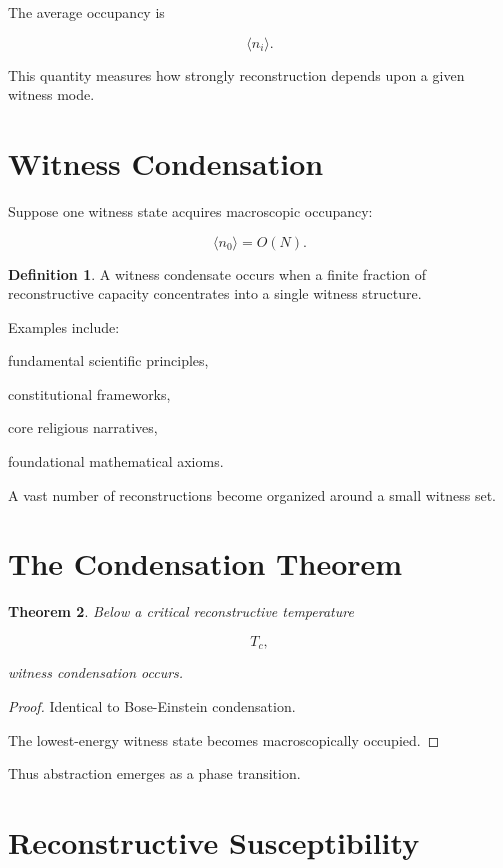 \documentclass[12pt,oneside]{book}
\theoremstyle{plain} \newtheorem{theorem}{Theorem}[chapter] \newtheorem{lemma}[theorem]{Lemma} \newtheorem{proposition}[theorem]{Proposition} \newtheorem{corollary}[theorem]{Corollary}
\theoremstyle{definition} \newtheorem{definition}[theorem]{Definition} \newtheorem{axiom}[theorem]{Axiom} \newtheorem{construction}[theorem]{Construction}
\theoremstyle{remark} \newtheorem{remark}[theorem]{Remark} \newtheorem{example}[theorem]{Example}
\begin{document}
The average occupancy is

\[
\langle n_i\rangle.
\]

This quantity measures how strongly reconstruction depends upon a given witness mode.

\section{Witness Condensation}

Suppose one witness state acquires macroscopic occupancy:

\[
\langle n_0\rangle
=
O(N).
\]

\begin{definition}

A witness condensate occurs when a finite fraction of reconstructive capacity concentrates into a single witness structure.

\end{definition}

Examples include:

fundamental scientific principles,

constitutional frameworks,

core religious narratives,

foundational mathematical axioms.

A vast number of reconstructions become organized around a small witness set.

\section{The Condensation Theorem}

\begin{theorem}

Below a critical reconstructive temperature

\[
T_c,
\]

witness condensation occurs.

\end{theorem}

\begin{proof}

Identical to Bose-Einstein condensation.

The lowest-energy witness state becomes macroscopically occupied.

\end{proof}

Thus abstraction emerges as a phase transition.

\section{Reconstructive Susceptibility}
\end{document}
